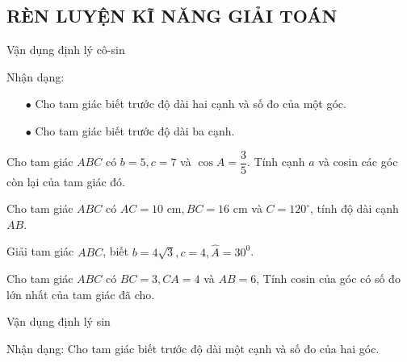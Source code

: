 \subsection{RÈN LUYỆN KĨ NĂNG GIẢI TOÁN}

\begin{dang}{Vận dụng định lý cô-sin}
	\begin{luuy}
		Nhận dạng:
		\begin{itemize}
			\item [$\bullet$] Cho tam giác biết trước độ dài hai cạnh và số đo của một góc.
			\item [$\bullet$] Cho tam giác biết trước độ dài ba cạnh.
		\end{itemize}
	\end{luuy}
\end{dang}

\begin{vd}
	Cho tam giác $ABC$ có $b=5, c=7$ và $\cos A=\dfrac{3}{5}$. Tính cạnh $a$ và cosin các góc còn lại của tam giác đó.
\end{vd}

\begin{vd}
	Cho tam giác $ABC$ có $AC = 10 \textrm{ cm}, BC = 16 \textrm{ cm}$ và $C=120^\circ$, tính độ dài cạnh $AB$.
\end{vd}

\begin{vd}
	Giải tam giác $ABC$, biết $b=4\sqrt{3},c=4,\widehat{A}=30^{0}$.
\end{vd}

\begin{vd}
	Cho tam giác $ABC$ có $BC=3, CA=4$ và $AB=6$, Tính cosin của góc có số đo lớn nhất của tam giác đã cho.
\end{vd}

\begin{dang}{Vận dụng định lý sin}
	\begin{luuy}
		Nhận dạng: Cho tam giác biết trước độ dài một cạnh và số đo của hai góc.
	\end{luuy}
\end{dang}

